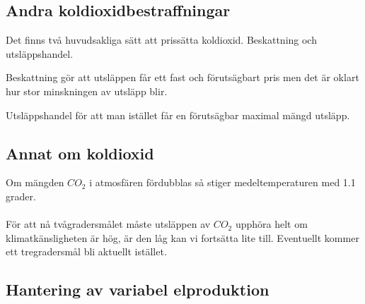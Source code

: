 \documentclass{article}
\begin{document}
\subsection{Andra koldioxidbestraffningar}
Det finns två huvudsakliga sätt att prissätta koldioxid. Beskattning och utsläppshandel.

Beskattning gör att utsläppen får ett fast och förutsägbart pris men det är oklart hur stor minskningen av utsläpp blir.

Utsläppshandel för att man istället får en förutsägbar maximal mängd utsläpp.

\subsection{Annat om koldioxid}

Om mängden $CO_2$ i atmosfären fördubblas så stiger medeltemperaturen med 1.1 grader.\\
\\
För att nå tvågradersmålet måste utsläppen av $CO_2$ upphöra helt om klimatkänsligheten är hög, är den låg kan vi fortsätta lite till. Eventuellt kommer ett tregradersmål bli aktuellt istället.


\subsection{Hantering av variabel elproduktion}
\end{document}
